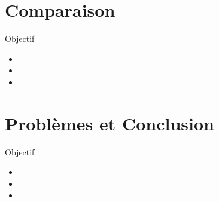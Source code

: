 \documentclass[t,12pt]{beamer}
\begin{document}
\section{Comparaison}                                                    %
\begin{frame}                                                         %
    \begin{center}{\textcolor{grisbleu}{\Large Objectif}}\end{center} %
    \begin{itemize}                                                   %
	\item
	\item
	\item
\end{itemize}
\end{frame}                                                            %


\section{Problèmes et Conclusion}                                                    %
\begin{frame}                                                         %
    \begin{center}{\textcolor{grisbleu}{\Large Objectif}}\end{center} %
    \begin{itemize}                                                   %
	\item
	\item
	\item
\end{itemize}
\end{frame}                                                            %
\end{document}
